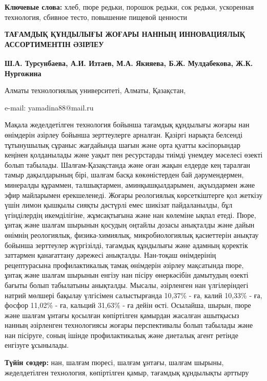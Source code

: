 {\bfseries Ключевые слова:} хлеб, пюре редьки, порошок редьки, сок редьки,
ускоренная технология, сбивное тесто, повышение пищевой ценности

\begin{articleheader}
{\bfseries ТАҒАМДЫҚ ҚҰНДЫЛЫҒЫ ЖОҒАРЫ НАННЫҢ ИННОВАЦИЯЛЫҚ АССОРТИМЕНТІН ӘЗІРЛЕУ}

{\bfseries
Ш.А. Турсунбаева,
А.И. Изтаев,
М.А. Якияева\textsuperscript{\envelope },
Б.Ж. Мулдабекова,
Ж.К. Нургожина
}
\end{articleheader}

\begin{affiliation}
Алматы технологиялық университеті, Алматы, Қазақстан,

e-mail: yamadina88@mail.ru
\end{affiliation}

Мақала жеделдетілген технология бойынша тағамдық құндылығы жоғары нан
өнімдерін әзірлеу бойынша зерттеулерге арналған. Қазіргі нарықта
белсенді тұтынушылық сұраныс жағдайында шағын және орта қуатты
кәсіпорындар кеңінен қолданылады және уақыт пен ресурстарды тиімді
үнемдеу мәселесі өзекті болып табылады. Шалғам-Қазақстанда және оған
жақын елдерде кең таралған тамыр дақылдарының бірі, шалғам басқа
көкөністерден бай дәрумендермен, минералды құраммен, талшықтармен,
аминқышқылдарымен, ақуыздармен және эфир майларымен ерекшеленеді. Жоғары
реологиялық көрсеткіштерге қол жеткізу үшін лимон қышқылы сияқты
дәстүрлі емес шикізат пайдаланылды, бұл үгінділердің икемділігіне,
жұмсақтығына және нан көлеміне ықпал етеді. Пюре, ұнтақ және шалғам
шырынын қосудың оңтайлы дозасы анықталды және дайын өнімнің реологиялық,
физика-химиялық, микробиологиялық қасиеттерін анықтау бойынша зерттеулер
жүргізілді, тағамдық құндылығы және адамның қоректік заттармен
қанағаттану дәрежесі анықталды. Нан-тоқаш өнімдерінің рецептурасына
профилактикалық тамақ өнімдерін әзірлеу мақсатында пюре, ұнтақ және
шалғам шырынын енгізу нан пісіру өнеркәсібін дамытудың өзекті бағыты
болып табылатыны анықталды. Мысалы, әзірленген нан үлгілеріндегі натрий
мөлшері бақылау үлгісімен салыстырғанда 10,37\% - ға, калий 10,33\% -
ға, фосфор 11,02\% - ға, кальций 31,63\% - ға дейін өсті. Осылайша,
шырын, пюре және шалғам ұнтағы қосылған көпіртілген қамырдан жасалған
ашытқысыз нанның әзірленген технологиясы жоғары перспективалы болып
табылады және нан пісіруге, соның ішінде профилактикалық және диеталық
агент ретінде енгізуге ұсынылады.

{\bfseries Түйін сөздер:} нан, шалғам пюресі, шалғам ұнтағы, шалғам шырыны,
жеделдетілген технология, көпіртілген қамыр, тағамдық құндылықты арттыру

